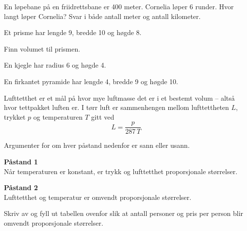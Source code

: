 \nes


En løpebane på en friidrettsbane er 400 meter.
Cornelia løper 6 runder. Hvor langt løper Cornelia? Svar i både antall meter og antall kilometer.

Et prisme har lengde 9, bredde 10 og høgde 8.\os

Finn volumet til prismen.


En kjegle har radius 6 og høgde 4.

En firkantet pyramide har lengde 4, bredde 9 og høgde 10.



\nes


 \vs
{}

Lufttetthet er et mål på hvor mye luftmasse det er i et bestemt volum – altså hvor tettpakket luften er. I tørr luft er sammenhengen mellom lufttettheten $L$, trykket $p$ og temperaturen $T$ gitt ved
\[
L = \frac{p}{287\,T}
\]

Argumenter for om hver påstand nedenfor er sann eller usann.\os

\textbf{Påstand 1} \\
Når temperaturen er konstant, er trykk og lufttetthet proporsjonale størrelser. \os

\textbf{Påstand 2} \\
Lufttetthet og temperatur er omvendt proporsjonale størrelser.

Skriv av og fyll ut tabellen ovenfor slik at antall personer og
pris per person blir omvendt proporsjonale størrelser.

